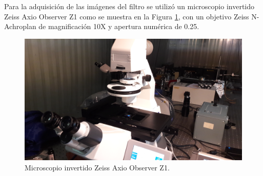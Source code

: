 \hspace{0.5cm}Para la adquisición de las imágenes del filtro se utilizó un microscopio invertido Zeiss Axio Observer Z1 como se muestra en la Figura \ref{fig:ZEISSdellabo}, con un objetivo Zeiss N-Achroplan de magnificación 10X y apertura numérica de 0.25.
\begin{figure}[H]
	\centering
	\includegraphics[scale=0.08]{Figs/defectosZEISS/b.jpg}
	\caption{Microscopio invertido Zeiss Axio Observer Z1.}
	\label{fig:ZEISSdellabo}
\end{figure}

